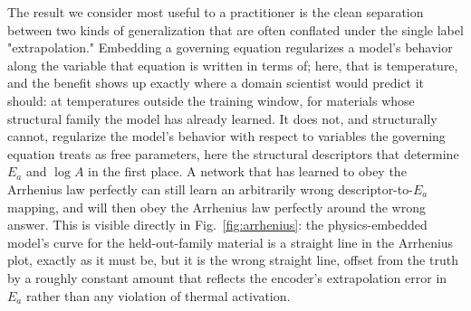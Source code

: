 \documentclass[11pt]{article}
\begin{document}
The result we consider most useful to a practitioner is the clean separation between two kinds of generalization that are often conflated under the single label "extrapolation." Embedding a governing equation regularizes a model's behavior along the variable that equation is written in terms of; here, that is temperature, and the benefit shows up exactly where a domain scientist would predict it should: at temperatures outside the training window, for materials whose structural family the model has already learned. It does not, and structurally cannot, regularize the model's behavior with respect to variables the governing equation treats as free parameters, here the structural descriptors that determine $E_a$ and $\log A$ in the first place. A network that has learned to obey the Arrhenius law perfectly can still learn an arbitrarily wrong descriptor-to-$E_a$ mapping, and will then obey the Arrhenius law perfectly around the wrong answer. This is visible directly in Fig.~\ref{fig:arrhenius}: the physics-embedded model's curve for the held-out-family material is a straight line in the Arrhenius plot, exactly as it must be, but it is the wrong straight line, offset from the truth by a roughly constant amount that reflects the encoder's extrapolation error in $E_a$ rather than any violation of thermal activation.
\end{document}
